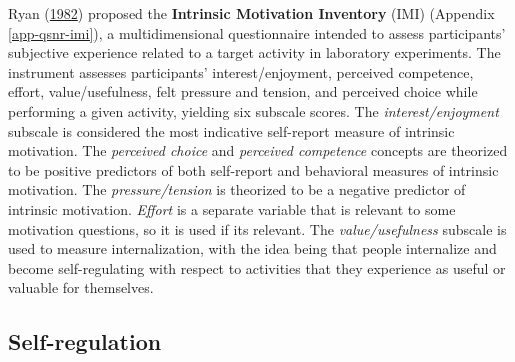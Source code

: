 \documentclass[letterpaper, nobind]{templates/ociamthesis}
\begin{document}
Ryan (\protect\hyperlink{ref-ryan1982control}{1982}) proposed the \textbf{Intrinsic Motivation Inventory} (IMI)
(Appendix \ref{app-qsnr-imi}), a multidimensional questionnaire intended to
assess participants' subjective experience related to a target activity
in laboratory experiments. The instrument assesses participants'
interest/enjoyment, perceived competence, effort, value/usefulness, felt
pressure and tension, and perceived choice while performing a given
activity, yielding six subscale scores. The \emph{interest/enjoyment}
subscale is considered the most indicative self-report measure of
intrinsic motivation. The \emph{perceived choice} and \emph{perceived competence}
concepts are theorized to be positive predictors of both self-report and
behavioral measures of intrinsic motivation. The \emph{pressure/tension} is
theorized to be a negative predictor of intrinsic motivation. \emph{Effort}
is a separate variable that is relevant to some motivation questions, so
it is used if its relevant. The \emph{value/usefulness} subscale is used to
measure internalization, with the idea being that people internalize and
become self-regulating with respect to activities that they experience
as useful or valuable for themselves.

\hypertarget{sec-bg-learn-self-regulation}{%
\subsection{Self-regulation}\label{sec-bg-learn-self-regulation}}
\end{document}
